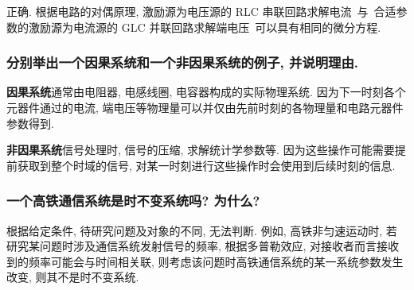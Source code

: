 正确. 根据电路的对偶原理, 激励源为电压源的 RLC 串联回路求解电流\ 与\ 合适参数的激励源为电流源的 GLC 并联回路求解端电压\ 可以具有相同的微分方程.

\subsubsection*{分别举出一个因果系统和一个非因果系统的例子, 并说明理由.}

\textbf{因果系统}\quad 通常由电阻器, 电感线圈, 电容器构成的实际物理系统. 因为下一时刻各个元器件通过的电流, 端电压等物理量可以并仅由先前时刻的各物理量和电路元器件参数得到.

\textbf{非因果系统}\quad 信号处理时, 信号的压缩, 求解统计学参数等. 因为这些操作可能需要提前获取到整个时域的信号, 对某一时刻进行这些操作时会使用到后续时刻的信息.

\subsubsection*{一个高铁通信系统是时不变系统吗? 为什么?}

根据给定条件, 待研究问题及对象的不同, 无法判断. 例如, 高铁非匀速运动时, 若研究某问题时涉及通信系统发射信号的频率, 根据多普勒效应, 对接收者而言接收到的频率可能会与时间相关联, 则考虑该问题时高铁通信系统的某一系统参数发生改变, 则其不是时不变系统.
